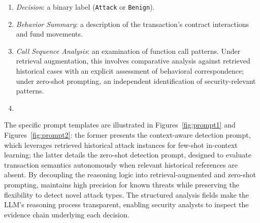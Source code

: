 
\begin{enumerate}
    \item \textit{Decision}: a binary label (\texttt{Attack} or \texttt{Benign}).
    \item \textit{Behavior Summary}: a description of the transaction's contract interactions and fund movements.
    \item \textit{Call Sequence Analysis}: an examination of function call patterns. Under retrieval augmentation, this involves comparative analysis against retrieved historical cases with an explicit assessment of behavioral correspondence; under zero-shot prompting, an independent identification of security-relevant patterns.
    \item {}
\end{enumerate}


The specific prompt templates are illustrated in Figures~\ref{fig:prompt1} and Figures~\ref{fig:prompt2}: the former presents the context-aware detection prompt, which leverages retrieved historical attack instances for few-shot in-context learning; the latter details the zero-shot detection prompt, designed to evaluate transaction semantics autonomously when relevant historical references are absent.
By decoupling the reasoning logic into retrieval-augmented and zero-shot prompting, \approach{} maintains high precision for known threats while preserving the flexibility to detect novel attack types. The structured analysis fields make the LLM's reasoning process transparent, enabling security analysts to inspect the evidence chain underlying each decision.

